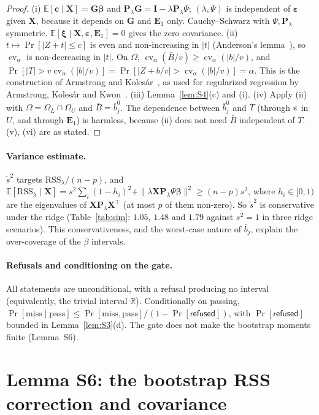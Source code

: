 \documentclass[11pt]{article}
\theoremstyle{definition}
\theoremstyle{plain}
\newcommand{\bX}{\mathbf{X}}
\newcommand{\bG}{\mathbf{G}}
\newcommand{\bI}{\mathbf{I}}
\newcommand{\bP}{\mathbf{P}}
\newcommand{\bc}{\mathbf{c}}
\newcommand{\bbeta}{\boldsymbol{\beta}}
\newcommand{\R}{\mathbb{R}}
\newcommand{\Ex}{\mathbb{E}}
\newcommand{\bE}{\mathbf{E}}
\newcommand{\bxi}{\boldsymbol{\xi}}
\newcommand{\bvarepsilon}{\boldsymbol{\varepsilon}}
\DeclareMathOperator{\cv}{cv}
\newcommand{\RSS}{\mathrm{RSS}}
\begin{document}
\begin{proof}
(i) $\Ex[\bc\mid\bX]=\bG\bbeta$ and $\bP_\lambda\bG=\bI-\lambda\bP_\lambda\Psi$; $(\lambda,\Psi)$ is independent of $\bvarepsilon$ given $\bX$, because it depends on $\bG$ and $\bE_1$ only. Cauchy--Schwarz with $\Psi,\bP_\lambda$ symmetric. $\Ex[\bxi\mid\bX,\bvarepsilon,\bE_1]=0$ gives the zero covariance. (ii) $t\mapsto\Pr[|Z+t|\le c]$ is even and non-increasing in $|t|$ (Anderson's lemma~\cite{Anderson55}), so $\cv_\alpha$ is non-decreasing in $|t|$. On $\Omega$, $\cv_\alpha(\bar B/v)\ge\cv_\alpha(|b|/v)$, and $\Pr[|T|>v\cv_\alpha(|b|/v)]=\Pr[|Z+b/v|>\cv_\alpha(|b|/v)]=\alpha$. This is the construction of Armstrong and Kolesár~\cite{AK20}, as used for regularized regression by Armstrong, Kolesár and Kwon~\cite{AKK20}. (iii) Lemma~\ref{lem:S4}(c) and (i). (iv) Apply (ii) with $\Omega=\Omega_L\cap\Omega_U$ and $\bar B=\bar b_j^0$. The dependence between $\bar b_j^0$ and $T$ (through $\bvarepsilon$ in $U$, and through $\bE_1$) is harmless, because (ii) does not need $\bar B$ independent of $T$. (v), (vi) are as stated.
\end{proof}

\paragraph{Variance estimate.} $\tilde s^2$ targets $\RSS_\lambda/(n-p)$, and $\Ex[\RSS_\lambda\mid\bX]=s^2\sum_i(1-h_i)^2+\|\lambda\bX\bP_\lambda\Psi\bbeta\|^2\ge(n-p)s^2$, where $h_i\in[0,1)$ are the eigenvalues of $\bX\bP_\lambda\bX^\top$ (at most $p$ of them non-zero). So $\tilde s^2$ is conservative under the ridge (Table~\ref{tab:sim}: $1.05$, $1.48$ and $1.79$ against $s^2=1$ in three ridge scenarios). This conservativeness, and the worst-case nature of $\bar b_j$, explain the over-coverage of the $\beta$ intervals.

\paragraph{Refusals and conditioning on the gate.} All statements are unconditional, with a refusal producing no interval (equivalently, the trivial interval $\R$). Conditionally on passing, $\Pr[\text{miss}\mid\text{pass}]\le\Pr[\text{miss},\text{pass}]/(1-\Pr[\textsf{refused}])$, with $\Pr[\textsf{refused}]$ bounded in Lemma~\ref{lem:S3}(d). The gate does not make the bootstrap moments finite (Lemma~S6).

\section{Lemma S6: the bootstrap RSS correction and covariance}
\label{sec:S6}
\end{document}
